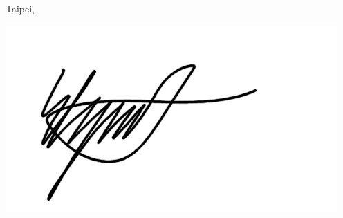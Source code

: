 \vspace*{1cm}
\begin{flushright}
    Taipei, \akhirMagang

    \vspace{0.5cm}
    
    \includegraphics[width=0.25\linewidth]{assets/TandaTangan.png}\\[0.5cm]

    \penulis

\end{flushright}